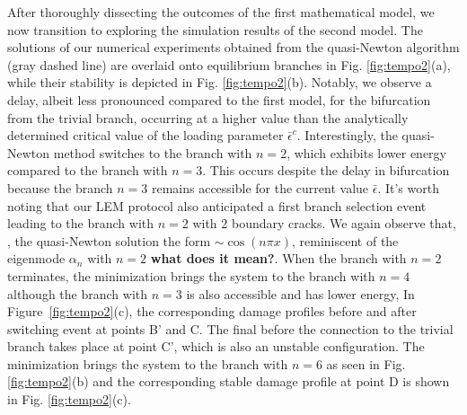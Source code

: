 After thoroughly dissecting the outcomes of the first mathematical model, we now transition to exploring the simulation results of the second model. The solutions of our  numerical experiments obtained from the quasi-Newton algorithm (gray dashed line) are overlaid onto equilibrium branches in Fig. \ref{fig:tempo2}(a), while their stability  is depicted in Fig. \ref{fig:tempo2}(b). Notably, we observe a delay, albeit less pronounced compared to the first model, for the bifurcation from the trivial branch, occurring at a higher value than the analytically determined critical value of the loading parameter \(\bar{\epsilon}^c\). Interestingly, the quasi-Newton method switches to the branch with $n=2$, which exhibits lower energy compared to the branch with $n=3$. This occurs  despite the delay in bifurcation because the branch  $n=3$ remains accessible for the current value $\bar\epsilon$. It's worth noting that our LEM protocol also anticipated a first branch selection event leading to the branch with $n=2$ with 2 boundary cracks. 
We again observe that, , the quasi-Newton solution  the form \(\sim \cos(n\pi x)\), reminiscent of the eigenmode $\alpha_n$  with \(n=2\) \textbf{what does it mean?}. 
When the branch with $n=2$ terminates, the minimization brings the system to the branch with $n=4$ although the branch with $n=3$ is also accessible and has lower energy, In Figure~\ref{fig:tempo2}(c), the corresponding damage profiles before and after  switching event  at points B' and C. The final  before the connection to the trivial branch takes place at point C', which is also an unstable configuration. The minimization brings the system to the branch with $n=6$ as seen in Fig. \ref{fig:tempo2}(b) and the corresponding stable damage profile at point D is shown in Fig. \ref{fig:tempo2}(c). 

